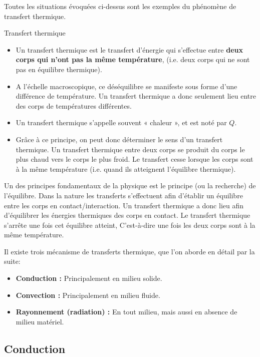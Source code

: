 \documentclass[11pt,a4paper]{article}
\begin{document}
Toutes les situations évoquées ci-dessus sont les exemples du phénomène de transfert thermique. 

\begin{defn}{Transfert thermique}
\begin{itemize}
    \item Un transfert thermique est le transfert d’énergie qui s’effectue entre \textbf{deux corps qui n’ont pas la même température}, (i.e. deux corps qui ne sont pas en équilibre thermique). 
    \item A l’échelle macroscopique, ce déséquilibre se manifeste sous forme d’une différence de température.  Un transfert thermique a donc seulement lieu entre des corps de températures différentes.  
    \item Un transfert thermique s’appelle souvent « chaleur », et est noté par $Q$.
    \item Grâce à ce principe, on peut donc déterminer le sens d’un transfert thermique. Un transfert thermique entre deux corps se produit du corps le plus chaud vers le corps le plus froid. Le transfert cesse lorsque les corps sont à la même température (i.e. quand ils atteignent l’équilibre thermique).  
\end{itemize}
\end{defn} 

\begin{rmrq}
Un des principes fondamentaux de la physique est le principe (ou la recherche) de l’équilibre.  Dans la nature les transferts s’effectuent afin d’établir un équilibre entre les corps en contact/interaction.  Un transfert thermique a donc lieu afin d’équilibrer les énergies thermiques des corps en contact. Le transfert thermique s'arrête une fois cet équilibre atteint, C'est-à-dire une fois les deux corps sont à la même température.
\end{rmrq}

Il existe trois mécanisme de transferts thermique, que l'on aborde en détail par la suite: 
\begin{itemize}
    \item \textbf{Conduction : }Principalement en milieu solide. 
    \item \textbf{Convection : }Principalement en milieu fluide. 
    \item \textbf{Rayonnement (radiation) : }En tout milieu, mais aussi en absence de milieu matériel. 
\end{itemize}

\subsection{Conduction}
\end{document}

